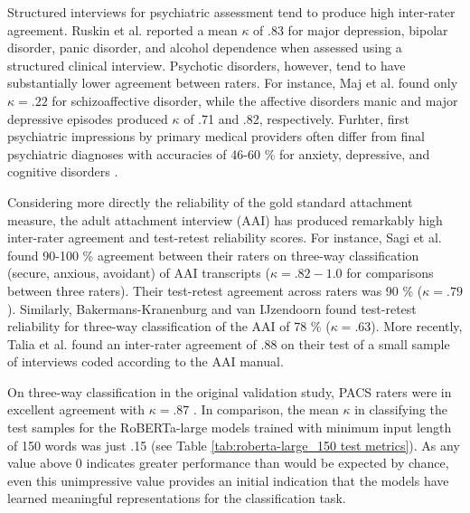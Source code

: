 \documentclass[12pt]{report}
\begin{document}
Structured interviews for psychiatric assessment tend to produce high inter-rater agreement.
Ruskin et al. \citeyear{Ruskin1998} reported a mean $\kappa$ of .83 for major depression, bipolar disorder, panic disorder, and alcohol dependence when assessed using a structured clinical interview.
Psychotic disorders, however, tend to have substantially lower agreement between raters.
For instance, Maj et al. \citeyear{Maj2000} found only $\kappa = .22$ for schizoaffective disorder, while the affective disorders manic and major depressive episodes produced $\kappa$ of .71 and .82, respectively.
Furhter, first psychiatric impressions by primary medical providers often differ from final psychiatric diagnoses with accuracies of 46-60 \% for anxiety, depressive, and cognitive disorders \cite{Al-Huthail2008}.

Considering more directly the reliability of the gold standard attachment measure, the adult attachment interview (AAI) has produced remarkably high inter-rater agreement and test-retest reliability scores.
For instance, Sagi et al. \citeyear{Sagi1994} found 90-100 \% agreement between their raters on three-way classification (secure, anxious, avoidant) of AAI transcripts ($\kappa = .82 - 1.0$ for comparisons between three raters). Their test-retest agreement across raters was 90 \% ($\kappa = .79$).
Similarly, Bakermans-Kranenburg and van IJzendoorn \citeyear{BakermansKranenburg1993} found test-retest reliability for three-way classification of the AAI of 78 \% ($\kappa = .63$).
More recently, Talia et al. \citeyear{Talia2020} found an inter-rater agreement of .88 on their test of a small sample of interviews coded according to the AAI manual.

On three-way classification in the original validation study, PACS raters were in excellent agreement with $\kappa = .87$ \cite{Talia2017}.
In comparison, the mean $\kappa$ in classifying the test samples for the RoBERTa-large models trained with minimum input length of 150 words was just .15 (see Table \ref{tab:roberta-large_150 test metrics}).
As any value above 0 indicates greater performance than would be expected by chance, even this unimpressive value provides an initial indication that the models have learned meaningful representations for the classification task.
\end{document}
